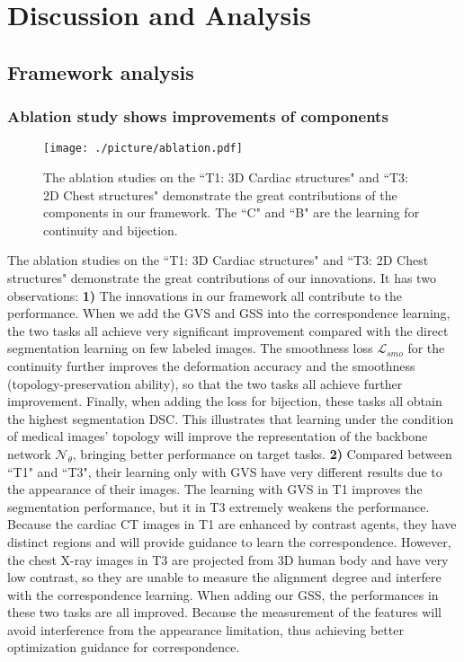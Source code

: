 \section{Discussion and Analysis}
\label{sec:discussion}
\subsection{Framework analysis}
\subsubsection{Ablation study shows improvements of components}
\begin{figure}
  \centering
  \texttt{[image: ./picture/ablation.pdf]}
  \caption{The ablation studies on the ``T1: 3D Cardiac structures" and ``T3: 2D Chest structures" demonstrate the great contributions of the components in our framework. The ``C" and ``B" are the learning for continuity and bijection.}
  \label{Fig:ablation}
\end{figure}
The ablation studies on the ``T1: 3D Cardiac structures" and ``T3: 2D Chest structures" demonstrate the great contributions of our innovations. It has two observations: \textbf{1)} The innovations in our framework all contribute to the performance. When we add the GVS and GSS into the correspondence learning, the two tasks all achieve very significant improvement compared with the direct segmentation learning on few labeled images. The smoothness loss $\mathcal{L}_{smo}$ for the continuity further improves the deformation accuracy and the smoothness (topology-preservation ability), so that the two tasks all achieve further improvement. Finally, when adding the loss for bijection, these tasks all obtain the highest segmentation DSC. This illustrates that learning under the condition of medical images' topology will improve the representation of the backbone network $\mathcal{N}_{\theta}$, bringing better performance on target tasks. \textbf{2)} Compared between ``T1" and ``T3", their learning only with GVS have very different results due to the appearance of their images. The learning with GVS in T1 improves the segmentation performance, but it in T3 extremely weakens the performance. Because the cardiac CT images in T1 are enhanced by contrast agents, they have distinct regions and will provide guidance to learn the correspondence. However, the chest X-ray images in T3 are projected from 3D human body and have very low contrast, so they are unable to measure the alignment degree and interfere with the correspondence learning. When adding our GSS, the performances in these two tasks are all improved. Because the measurement of the features will avoid interference from the appearance limitation, thus achieving better optimization guidance for correspondence.
